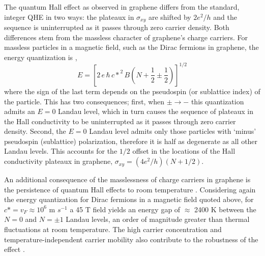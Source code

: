 \documentclass[edeposit,fullpage,draftthesis]{uiucthesis2009}
\begin{document}
        The quantum Hall effect as observed in graphene differs from the 
        standard, integer QHE in two ways: the plateaux in $\sigma_{xy}$ are shifted by $2 e^2/h$ and the sequence 
        is uninterrupted as it passes through zero carrier density. Both differences stem from 
        the massless character of graphene's charge carriers.
        For massless particles in a magnetic field, such as the Dirac fermions in graphene, 
        the energy quantization is \cite{Novoselov2005}, 
        \begin{equation}
            E = \left[ 2\,e\,\hbar\,{c\ast}^2\,B \left(N + \frac{1}{2} \pm \frac{1}{2}\right) \right]^{1/2} 
        \end{equation}
        where the sign of the last term depends on the pseudospin (or sublattice index) of the particle. 
        This has two consequences; first, when $\pm \rightarrow -$ this quantization admits an $E=0$ Landau level, 
        which in turn causes the sequence of plateaux in the Hall conductivity to be uninterrupted as it 
        passes through zero carrier density. Second, the $E=0$ Landau level admits only those particles 
        with `minus' pseudospin (sublattice) polarization, therefore it is half as degenerate as all other Landau levels. 
        This accounts for the $1/2$ offset in the locations of the Hall conductivity plateaux in graphene, 
        $\sigma_{xy} = (4 e^2/h )(N + 1/2)$.
     
        
        An additional consequence of the masslessness of charge carriers in graphene is the persistence of quantum Hall effects to room temperature \cite{Novoselov2007}. Considering again the energy quantization for Dirac fermions in a magnetic field quoted above, for $c\ast = v_F \approx 10^6$ m $s^{-1}$ a 45 T field yields an energy gap of $\approx$ 2400 K between the $N=0$ and $N=\pm1$ Landau levels, an order of magnitude greater than thermal fluctuations at room temperature. The high carrier concentration and temperature-independent carrier mobility also contribute to the robustness of the effect \cite{Novoselov2007}.
    
\end{document}
